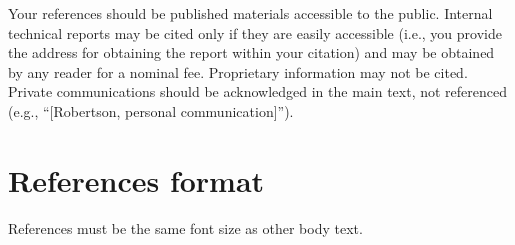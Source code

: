 \documentclass{sigchi}
\begin{document}
Your references should be published materials accessible to the
public.  Internal technical reports may be cited only if they are
easily accessible (i.e., you provide the address for obtaining the
report within your citation) and may be obtained by any reader for a
nominal fee.  Proprietary information may not be cited. Private
communications should be acknowledged in the main text, not referenced
(e.g., ``[Robertson, personal communication]'').

%
%
%
%
%
\balance

\section{References format}
References must be the same font size as other body text.



\end{document}
